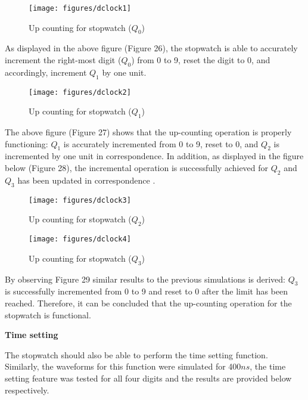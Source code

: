 \documentclass[12pt,a4paper]{article}
\begin{document}
	\begin{figure}[H]
		\centering
		\texttt{[image: figures/dclock1]}
		\caption{Up counting for stopwatch ($Q_{0}$)}
	\end{figure}
	
	\noindent As displayed in the above figure (Figure 26), the stopwatch is able to accurately increment the right-most digit ($Q_{0}$) from 0 to 9, reset the digit to 0, and accordingly, increment $Q_{1}$ by one unit. 
	
	\begin{figure}[H]
		\centering
		\texttt{[image: figures/dclock2]}
		\caption{Up counting for stopwatch ($Q_{1}$)}
	\end{figure}
	
	\noindent The above figure (Figure 27) shows that the up-counting operation is properly functioning: $Q_{1}$ is accurately incremented from 0 to 9, reset to 0, and $Q_{2}$ is incremented by one unit in correspondence. In addition, as displayed in the figure below (Figure 28), the incremental operation is successfully achieved for $Q_{2}$ and $Q_{3}$ has been updated in correspondence .
	
	\begin{figure}[H]
		\centering
		\texttt{[image: figures/dclock3]}
		\caption{Up counting for stopwatch ($Q_{2}$)}
	\end{figure}
	
	\begin{figure}[H]
		\centering
		\texttt{[image: figures/dclock4]}
		\caption{Up counting for stopwatch ($Q_{3}$)}
	\end{figure}
	
	\noindent By observing Figure 29 similar results to the previous simulations is derived:  $Q_{3}$ is successfully incremented from 0 to 9 and reset to 0 after the limit has been reached. Therefore, it can be concluded that the up-counting operation for the stopwatch is functional. 
	
	
	\vspace{0.3cm}
	\noindent \textbf{Time setting}
	\vspace{0.2cm}
	
	\noindent The stopwatch should also be able to perform the time setting function. Similarly, the waveforms for this function were simulated for 400$ns$, the time setting feature was tested for all four digits and the results are provided below respectively.
	
\end{document}
